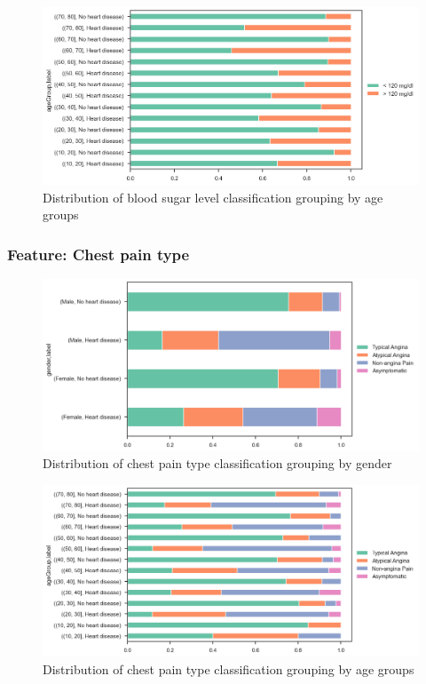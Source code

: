 \begin{figure}
    \caption{Distribution of blood sugar level classification grouping by age groups}\label{frequency-bloodsugar-agegroup-percent}
    \centering
    \includegraphics[width=\linewidth]{media/frequency-08-agegroup-bloodsugar.png}
\end{figure}

\subsubsection{Feature: Chest pain type}

\begin{figure}
    \caption{Distribution of chest pain type classification grouping by gender}\label{frequency-paintype-gender-percent}
    \centering
    \includegraphics[width=\linewidth]{media/frequency-09-gender-paintype.png}
\end{figure}

\begin{figure}
    \caption{Distribution of chest pain type classification grouping by age groups}\label{frequency-paintype-agegroup-percent}
    \centering
    \includegraphics[width=\linewidth]{media/frequency-10-agegroup-paintype.png}
\end{figure}

